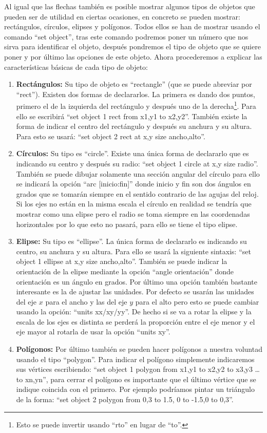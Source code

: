 \documentclass[11pt,a4paper,twoside,pdf]{article}
\numberwithin{equation}{section}
\begin{document}
Al igual que las flechas también es posible mostrar algunos tipos de objetos que pueden ser de utilidad en ciertas ocasiones, en concreto se pueden mostrar: rectángulos, círculos, elipses y polígonos. Todos ellos se han de mostrar usando el comando ``set object'', tras este comando podremos poner un número que nos sirva para identificar el objeto, después pondremos el tipo de objeto que se quiere poner y por último las opciones de este objeto. Ahora procederemos a explicar las características básicas de cada tipo de objeto:

\begin{enumerate}
	\item \textbf{Rectángulos:} Su tipo de objeto es ``rectangle'' (que se puede abreviar por ``rect''). Existen dos formas de declararlos. La primera es dando dos puntos, primero el de la izquierda del rectángulo y después uno de la derecha\footnote{Esto se puede invertir usando ``rto'' en lugar de ``to''.}. Para ello se escribirá ``set object 1 rect from x1,y1 to x2,y2''. También existe la forma de indicar el centro del rectángulo y después su anchura y su altura. Para esto se usará: ``set object 2 rect at x,y size ancho,alto''.
	\item \textbf{Círculos:} Su tipo es ``circle''. Existe una única forma de declararlo que es indicando su centro y después su radio: ``set object 1 circle at x,y size radio''. También se puede dibujar solamente una sección angular del círculo para ello se indicará la opción ``arc [inicio:fin]'' donde inicio y fin son dos ángulos en grados que se tomarán siempre en el sentido contrario de las agujas del reloj. Si los ejes no están en la misma escala el círculo en realidad se tendría que mostrar como una elipse pero el radio se toma siempre en las coordenadas horizontales por lo que esto no pasará, para ello se tiene el tipo elipse.
	\item \textbf{Elipse:} Su tipo es ``ellipse''. La única forma de declararlo es indicando su centro, su anchura y su altura. Para ello se usará la siguiente sintaxis: ``set object 1 ellipse at x,y size ancho,alto''. También se puede indicar la orientación de la elipse mediante la opción ``angle orientación'' donde orientación es un ángulo en grados. Por último una opción también bastante interesante es la de ajustar las unidades. Por defecto se usarán las unidades del eje $x$ para el ancho y las del eje $y$ para el alto pero esto se puede cambiar usando la opción: ``units xx/xy/yy''. De hecho si se va a rotar la elipse y la escala de los ejes es distinta se perderá la proporción entre el eje menor y el eje mayor al rotarla de usar la opción ``units xy''.
	\item \textbf{Polígonos:} Por último también se pueden hacer polígonos a nuestra voluntad usando el tipo ``polygon''. Para indicar el polígono simplemente indicaremos sus vértices escribiendo: ``set object 1 polygon from x1,y1 to x2,y2 to x3,y3 \ldots to xn,yn'', para cerrar el polígono es importante que el último vértice que se indique coincida con el primero. Por ejemplo podríamos pintar un triángulo de la forma: ``set object 2 polygon from 0,3 to 1.5, 0 to -1.5,0 to 0,3''.
\end{enumerate}
\end{document}
